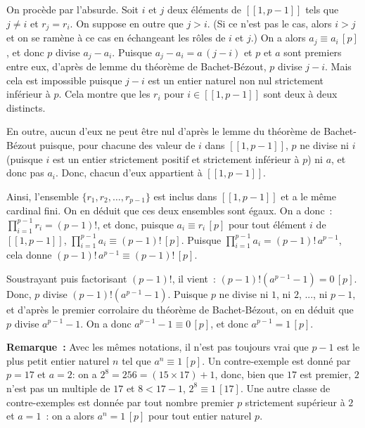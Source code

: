 On procède par l'absurde. 
Soit $i$ et $j$ deux éléments de $[\![1, p-1]\!]$ tels que $j \neq i$ et $r_j = r_i$. 
On suppose en outre que $j > i$. 
(Si ce n'est pas le cas, alors $i > j$ et on se ramène à ce cas en échangeant les rôles de $i$ et $j$.)
On a alors $a_j \equiv a_i \, [p]$, et donc $p$ divise $a_j - a_i$. 
Puisque $a_j - a_i = a \, (j-i)$ et $p$ et $a$ sont premiers entre eux, d'après de lemme du théorème de Bachet-Bézout, $p$ divise $j-i$. 
Mais cela est impossible puisque $j-i$ est un entier naturel non nul strictement inférieur à $p$. 
Cela montre que les $r_i$ pour $i \in [\![1, p-1]\!]$ sont deux à deux distincts. 

En outre, aucun d'eux ne peut être nul d'après le lemme du théorème de Bachet-Bézout puisque, pour chacune des valeur de $i$ dans $[\![1,p-1]\!]$, $p$ ne divise ni $i$ (puisque $i$ est un entier strictement positif et strictement inférieur à $p$) ni $a$, et donc pas $a_i$.
Donc, chacun d'eux appartient à $[\![1, p-1]\!]$.

Ainsi, l'ensemble $\lbrace r_1, r_2, \dots, r_{p-1} \rbrace$ est inclus dans $[\![1, p-1]\!]$ et a le même cardinal fini. 
On en déduit que ces deux ensembles sont égaux. 
On a donc : $\prod_{i=1}^{p-1} r_i = (p-1)!$, et donc, puisque $a_i \equiv r_i \, [p]$ pour tout élément $i$ de $[\![1, p-1]\!]$, $\prod_{i=1}^{p-1} a_i \equiv (p-1)! \, [p]$.
Puisque $\prod_{i=1}^{p-1} a_i = (p-1)! \, a^{p-1}$, cela donne $(p-1)! \, a^{p-1} \equiv (p-1)! \, [p]$.

Soustrayant puis factorisant $(p-1)!$, il vient : $(p-1)! \left( a^{p-1} - 1 \right) = 0 \, [p]$. 
Donc, $p$ divise $(p-1)! \left( a^{p-1} - 1 \right)$. 
Puisque $p$ ne divise ni $1$, ni $2$, ..., ni $p-1$, et d'après le premier corrolaire du théorème de Bachet-Bézout, on en déduit que $p$ divise $a^{p-1} - 1$. 
On a donc $a^{p-1} - 1 \equiv 0 \, [p]$, et donc $a^{p-1} = 1 \, [p]$.

\done

\medskip

\noindent\textbf{Remarque :} Avec les mêmes notations, il n'est pas toujours vrai que $p-1$ est le plus petit entier naturel $n$ tel que $a^n \equiv 1 \, [p]$.
    Un contre-exemple est donné par $p = 17$ et $a = 2$: on a $2^8 = 256 = (15 \times 17) + 1$, donc, bien que $17$ est premier, $2$ n'est pas un multiple de $17$ et $8 < 17 - 1$, $2^8 \equiv 1 \, [17]$. 
    Une autre classe de contre-exemples est donnée par tout nombre premier $p$ strictement supérieur à $2$ et $a = 1$ : on a alors $a^n = 1 \, [p]$ pour tout entier naturel $p$.
